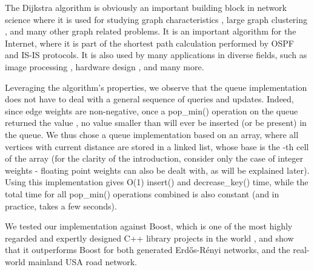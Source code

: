 \documentclass[conference,10pt,twocolumn]{IEEEtran}
\begin{document}
The Dijkstra algorithm is obviously an important building block in network science where it is used for studying graph characteristics \cite{example-JJ,example-BIU}, large graph clustering \cite{BSWW14}, and many other graph related problems.  It is an important algorithm for the Internet, where it is
part of the shortest path calculation performed by OSPF \cite{ospf} and IS-IS \cite{is-is} protocols. It is also used by many applications in diverse fields, such as image processing \cite{avidan2007seam}, hardware design \cite{example-Cidon}, and many more.

Leveraging the algorithm's properties, we observe that the queue implementation does not have to deal with a general sequence of queries and updates. Indeed, since edge weights are non-negative, once a pop\_min() operation on the queue returned the value , no value smaller than  will ever be inserted (or be present) in the queue. We thus chose a queue implementation based on an array, where all vertices with current distance  are stored in a linked list, whose base is the -th cell of the array (for the clarity of the introduction, consider only the case of integer weights - floating point weights can also be dealt with, as will be explained later). Using this implementation gives O(1) insert() and decrease\_key() time, while the total time for all pop\_min() operations combined is also constant (and in practice, takes a few seconds).

We tested our implementation against Boost, which is one of the most highly regarded and expertly designed C++ library projects in the world \cite{Boost-brag}, and show that it outperforms Boost for both generated Erd\H{o}s-R\'{e}nyi networks, and the real-world mainland USA road network.
\end{document}
